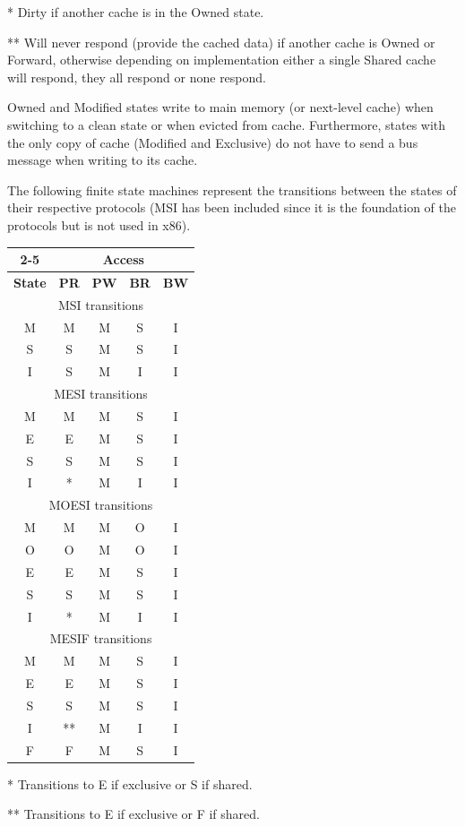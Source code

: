 \documentclass{article}
\newcommand{\layout}[1]{\parbox{\linewidth}{#1}}
\begin{document}
* Dirty if another cache is in the Owned state.

** Will never respond (provide the cached data) if another cache is Owned or Forward, otherwise depending on implementation either a single Shared cache will respond, they all respond or none respond.

Owned and Modified states write to main memory (or next-level cache) when switching to a clean state or when evicted from cache.
Furthermore, states with the only copy of cache (Modified and Exclusive) do not have to send a bus message when writing to its cache.

\layout{
  The following finite state machines represent the transitions between the states of their respective protocols (MSI has been included since it is the foundation of the protocols but is not used in x86).
  \begin{table}[H]
    \centering
    \begin{tabular}{|c|c|c|c|c|}
      \cline{2-5} \multicolumn{1}{c|}{} & \multicolumn{4}{c|}{\textbf{Access}} \\ \hline
      \textbf{State} & \textbf{PR} & \textbf{PW} & \textbf{BR} & \textbf{BW} \\ \hline
      \multicolumn{5}{|c|}{MSI transitions \cite{cache-msi}} \\ \hline
      M & M & M & S & I \\
      S & S & M & S & I \\
      I & S & M & I & I \\ \hline
      \multicolumn{5}{|c|}{MESI transitions \cite{cache-mesi}} \\ \hline
      M & M & M & S & I \\
      E & E & M & S & I \\
      S & S & M & S & I \\
      I & * & M & I & I \\ \hline
      \multicolumn{5}{|c|}{MOESI transitions \cite{cache-moesi}} \\ \hline
      M & M & M & O & I \\
      O & O & M & O & I \\
      E & E & M & S & I \\
      S & S & M & S & I \\
      I & * & M & I & I \\ \hline
      \multicolumn{5}{|c|}{MESIF transitions \cite{cache-mesif}} \\ \hline
      M & M & M & S & I \\
      E & E & M & S & I \\
      S & S & M & S & I \\
      I & ** & M & I & I \\
      F & F & M & S & I \\ \hline
    \end{tabular}
  \end{table}

  * Transitions to E if exclusive or S if shared.

  ** Transitions to E if exclusive or F if shared.
}
\end{document}
